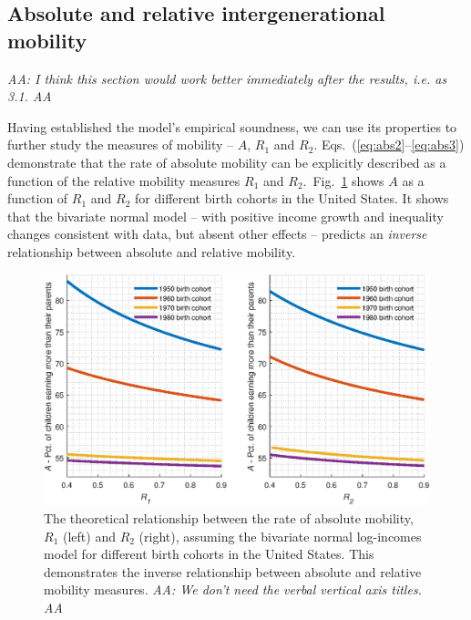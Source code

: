 \documentclass[12pt,a4paper]{article}
\newcommand{\red}[1]{{\color{red} #1}}
\newcommand{\AAA}[1]{\red{{\it AA: #1 AA}}}
\newcommand{\flabel}[1]{\label{fig:#1}}
\newcommand{\fref}[1]{Fig.~\ref{fig:#1}}
\numberwithin{equation}{section}
\begin{document}
\subsection{Absolute and relative intergenerational mobility}
\label{sec:theory}

\AAA{I think this section would work better immediately after the results, i.e. as 3.1.}

Having established the model's empirical soundness, we can use its properties to further study the measures of mobility -- $A$, $R_1$ and $R_2$. Eqs.~(\ref{eq:abs2}--\ref{eq:abs3}) demonstrate that the rate of absolute mobility can be explicitly described as a function of the relative mobility measures $R_1$ and $R_2$.~\fref{relat} shows $A$ as a function of $R_1$ and $R_2$ for different birth cohorts in the United States. It shows that the bivariate normal model -- with positive income growth and inequality changes consistent with data, but absent other effects -- predicts an \textit{inverse} relationship between absolute and relative mobility.

\begin{figure}[!htb]
\centering
\includegraphics[width=1.0\textwidth] {./figs/R1_R2.eps}
\caption{The theoretical relationship between the rate of absolute mobility, $R_1$ (left) and $R_2$ (right), assuming the bivariate normal log-incomes model for different birth cohorts in the United States. This demonstrates the inverse relationship between absolute and relative mobility measures. \AAA{We don't need the verbal vertical axis titles.}}
\flabel{relat}
\end{figure}
\end{document}
